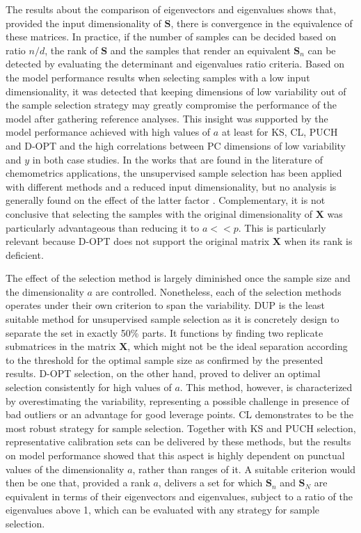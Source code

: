 \documentclass[journal=ancham,manuscript=article]{achemso}
\begin{document}
The results about the comparison of eigenvectors and eigenvalues shows that, provided the input dimensionality of $\mathbf{S}$, there is convergence in the equivalence of these matrices. In practice, if the number of samples can be decided based on ratio $n/d$, the rank of $\mathbf{S}$ and the samples that render an equivalent $\mathbf{S}_n$ can be detected by evaluating the determinant and eigenvalues ratio criteria. Based on the model performance results when selecting samples with a low input dimensionality, it was detected that keeping dimensions of low variability out of the sample selection strategy may greatly compromise the performance of the model after gathering reference analyses. This insight was supported by the model performance achieved with high values of $a$ at least for KS, CL, PUCH and D-OPT and the high correlations between PC dimensions of low variability and $y$ in both case studies. In the works that are found in the literature of chemometrics applications, the unsupervised sample selection has been applied with different methods and a reduced input dimensionality, but no analysis is generally found on the effect of the latter factor \cite{Naes1990, Brandmaier2012, Nawar2018, Au2020}. Complementary, it is not conclusive that selecting the samples with the original dimensionality of $\mathbf{X}$ was particularly advantageous than reducing it to $a<<p$. This is particularly relevant because D-OPT does not support the original matrix $\mathbf{X}$ when its rank is deficient.

The effect of the selection method is largely diminished once the sample size and the dimensionality $a$ are controlled. Nonetheless, each of the selection methods operates under their own criterion to span the variability. DUP is the least suitable method for unsupervised sample selection as it is concretely design to separate the set in exactly 50\% parts. It functions by finding two replicate submatrices in the matrix $\mathbf{X}$, which might not be the ideal separation according to the threshold for the optimal sample size as confirmed by the presented results. D-OPT selection, on the other hand, proved to deliver an optimal selection consistently for high values of $a$. This method, however, is characterized by overestimating the variability, representing a possible challenge in presence of bad outliers or an advantage for good leverage points. CL demonstrates to be the most robust strategy for sample selection. Together with KS and PUCH selection, representative calibration sets can be delivered by these methods, but the results on model performance showed that this aspect is highly dependent on punctual values of the dimensionality $a$, rather than ranges of it. A suitable criterion would then be one that, provided a rank $a$, delivers a set for which $\mathbf{S}_n$ and $\mathbf{S}_N$ are equivalent in terms of their eigenvectors and eigenvalues, subject to a ratio of the eigenvalues above 1, which can be evaluated with any strategy for sample selection. 
\end{document}

